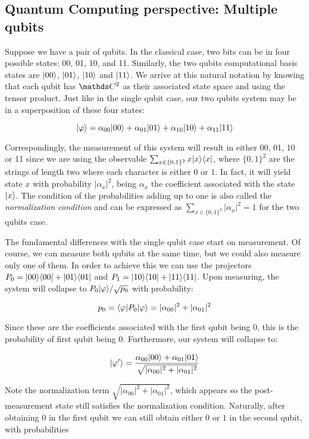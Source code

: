 \subsection{Quantum Computing perspective: Multiple qubits}


Suppose we have a pair of qubits. In the classical case, two bits can be in four possible states: 00, 01, 10, and 11. Similarly, the two qubits computational basis states are $|00\rangle$, $|01\rangle$, $|10\rangle$ and $|11\rangle$. We arrive at this natural notation by knowing that each qubit has $\C^2$ as their associated state space and using the tensor product. Just like in the single qubit case, our two qubits system may be in a superposition of these four states:

$$ |\varphi\rangle = \alpha_{00} |00\rangle + \alpha_{01} |01\rangle + \alpha_{10} |10\rangle + \alpha_{11} |11\rangle $$

Correspondingly, the measurement of this system will result in either 00, 01, 10 or 11 since we are using the observable $\sum_{x \in \{0,1\}^2} x |x\rangle\langle x|$, where $\{0,1\}^2$ are the strings of length two where each character is either $0$ or $1$. In fact, it will yield state $x$ with probability $|\alpha_x|^2$, being $\alpha_x$ the coefficient associated with the state $|x\rangle$. The condition of the probabilities adding up to one is also called the \emph{normalization condition} and can be expressed as $\sum_{x \in \{0,1\}^2} |\alpha_x|^2 = 1$ for the two qubits case.

The fundamental differences with the single qubit case start on measurement. Of course, we can measure both qubits at the same time, but we could also measure only one of them. In order to achieve this we can use the projectors $P_0 = |00\rangle\langle00| + |01\rangle\langle01|$ and $P_1 = |10\rangle\langle10| + |11\rangle\langle11|$. Upon measuring, the system will collapse to $P_0|\varphi\rangle / \sqrt{p_0}$ with probability:

$$ p_0 = \langle\varphi|P_0|\varphi\rangle = |\alpha_{00}|^2 + |\alpha_{01}|^2 $$

Since these are the coefficients associated with the first qubit being $0$, this is the probability of first qubit being 0. Furthermore, our system will collapse to:

$$ |\varphi'\rangle = \frac{ \alpha_{00} |00\rangle + \alpha_{01} |01\rangle }{ \sqrt{|\alpha_{00}|^2 + |\alpha_{01}|^2} } $$

Note the normalization term $\sqrt{|\alpha_{00}|^2 + |\alpha_{01}|^2}$, which appears so the post-measurement state still satisfies the normalization condition. Naturally, after obtaining $0$ in the first qubit we can still obtain either $0$ or $1$ in the second qubit, with probabilities 

